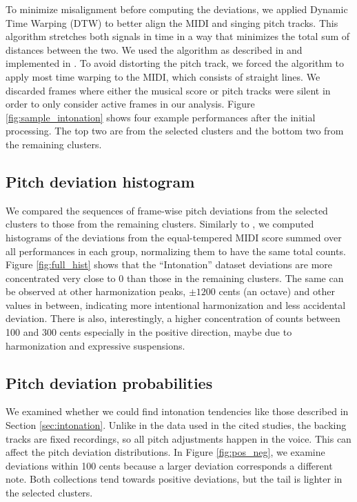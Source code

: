 To minimize misalignment before computing the deviations, we applied Dynamic Time Warping (DTW) \cite{berndt1994using} to better align the MIDI and singing pitch tracks. This algorithm stretches both signals in time in a way that minimizes the total sum of distances between the two. We used the algorithm as described in \cite{muller2015fundamentals} and implemented in \cite{mcfee2015librosa}. To avoid distorting the pitch track, we forced the algorithm to apply most time warping to the MIDI, which consists of straight lines. We discarded frames where either the musical score or pitch tracks were silent in order to only consider active frames in our analysis. Figure \ref{fig:sample_intonation} shows four example performances after the initial processing. The top two are from the selected clusters and the bottom two from the remaining clusters.

\subsection{Pitch deviation histogram}
We compared the sequences of frame-wise pitch deviations from the selected clusters to those from the remaining clusters. Similarly to \cite{nichols2012automatically}, we computed histograms of the deviations from the equal-tempered MIDI score summed over all performances in each group, normalizing them to have the same total counts. Figure \ref{fig:full_hist} shows that the ``Intonation'' dataset deviations are more concentrated very close to 0 than those in the remaining clusters. The same can be observed at other harmonization peaks, $\pm1200$ cents (an octave) and other values in between, indicating more intentional harmonization and less accidental deviation. There is also, interestingly, a higher concentration of counts between 100 and 300 cents especially in the positive direction, maybe due to harmonization and expressive suspensions.

\subsection{Pitch deviation probabilities}
We examined whether we could find intonation tendencies like those described in Section \ref{sec:intonation}. Unlike in the data used in the cited studies, the backing tracks are fixed recordings, so all pitch adjustments happen in the voice. This can affect the pitch deviation distributions. In Figure \ref{fig:pos_neg}, we examine deviations within 100 cents because a larger deviation corresponds a different note. Both collections tend towards positive deviations, but the tail is lighter in the selected clusters.

